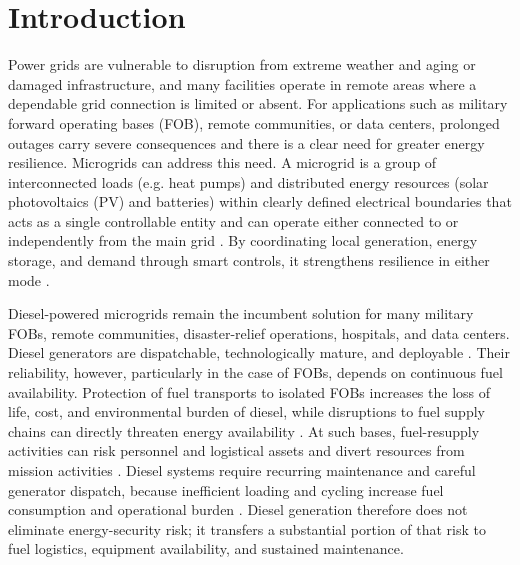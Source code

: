 \documentclass[
  journal=large,
  manuscript=article-type,
  year=2020,
  volume=37,
]{cup-journal}
\begin{document}

\section{Introduction}

Power grids are vulnerable to disruption from extreme weather and aging or damaged infrastructure, and many facilities operate in remote areas where a dependable grid connection is limited or absent. For applications such as military forward operating bases (FOB), remote communities, or data centers, prolonged outages carry severe consequences and there is a clear need for greater energy resilience. Microgrids can address this need. A microgrid is a group of interconnected loads (e.g. heat pumps) and distributed energy resources (solar photovoltaics (PV) and batteries) within clearly defined electrical boundaries that acts as a single controllable entity and can operate either connected to or independently from the main grid \parencite{ref2}. By coordinating local generation, energy storage, and demand through smart controls, it strengthens resilience in either mode \parencite{ref1}.

\CUPTWOCOL 

Diesel-powered microgrids remain the incumbent solution for many military FOBs, remote communities, disaster-relief operations, hospitals, and data centers. Diesel generators are dispatchable, technologically mature, and deployable \parencite{ref3,ref4}. Their reliability, however, particularly in the case of FOBs, depends on continuous fuel availability. Protection of fuel transports to isolated FOBs increases the loss of life, cost, and environmental burden of diesel, while disruptions to fuel supply chains can directly threaten energy availability \parencite{ref3,ref5}. At such bases, fuel-resupply activities can risk personnel and logistical assets and divert resources from mission activities \parencite{ref3}. Diesel systems require recurring maintenance and careful generator dispatch, because inefficient loading and cycling increase fuel consumption and operational burden \parencite{ref4}. Diesel generation therefore does not eliminate energy-security risk; it transfers a substantial portion of that risk to fuel logistics, equipment availability, and sustained maintenance.
\end{document}
